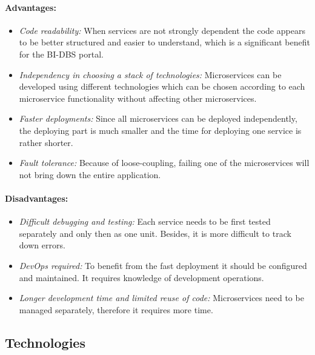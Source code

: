 \paragraph*{Advantages:}
\begin{itemize}
  \item \emph{Code readability:} When services are not strongly dependent the code appears to be better structured and easier to understand, which is a significant benefit for the BI-DBS portal.
  
  \item \emph{Independency in choosing a stack of technologies:} Microservices can be developed using different technologies which can be chosen according to each microservice functionality without affecting other microservices.
  
  \item \emph{Faster deployments:} Since all microservices can be deployed independently, the deploying part is much smaller and the time for deploying one service is rather shorter.

  \item \emph{Fault tolerance:} Because of loose-coupling, failing one of the microservices will not bring down the entire application.
\end{itemize}

\paragraph*{Disadvantages:}
\begin{itemize}
  \item \emph{Difficult debugging and testing:} Each service needs to be first tested separately and only then as one unit. Besides, it is more difficult to track down errors.

  \item \emph{DevOps required:} To benefit from the fast deployment it should be configured and maintained. It requires knowledge of development operations.

  \item \emph{Longer development time and limited reuse of code:} Microservices need to be managed separately, therefore it requires more time.
\end{itemize}



\subsection{Technologies}

